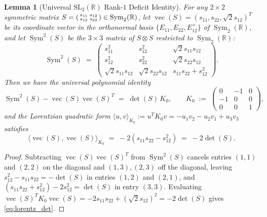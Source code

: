 \documentclass[11pt,a4paper]{article}
\theoremstyle{plain}
\newtheorem{lemma}[theorem]{Lemma}
\theoremstyle{definition}
\theoremstyle{remark}
\DeclareMathOperator{\Sym}{Sym}
\DeclareMathOperator{\vecop}{vec}
\begin{document}
\begin{lemma}[Universal $\mathrm{SL}_2(\mathbb{R})$ Rank-$1$ Deficit Identity]\label{lem:sl2}
For any $2 \times 2$ symmetric matrix $S = \begin{psmallmatrix} s_{11} & s_{12} \\ s_{12} & s_{22} \end{psmallmatrix} \in \Sym_2(\mathbb{R})$, let $\vecop(S) = (s_{11}, s_{22}, \sqrt{2}s_{12})^T$ be its coordinate vector in the orthonormal basis $\{E_{11}, E_{22}, E_{12}^+\}$ of $\Sym_2(\mathbb{R})$, and let $\Sym^2(S)$ be the $3 \times 3$ matrix of $S \otimes S$ restricted to $\Sym_2(\mathbb{R})$:
\[
  \Sym^2(S) \;=\; \begin{pmatrix} s_{11}^2 & s_{12}^2 & \sqrt{2}s_{11}s_{12} \\ s_{12}^2 & s_{22}^2 & \sqrt{2}s_{22}s_{12} \\ \sqrt{2}s_{11}s_{12} & \sqrt{2}s_{22}s_{12} & s_{11}s_{22} + s_{12}^2 \end{pmatrix}.
\]
Then we have the universal polynomial identity
\begin{equation}\label{eq:sl2_identity}
  \boxed{\Sym^2(S) - \vecop(S)\vecop(S)^T \;=\; \det(S)\, K_0, \qquad K_0 \;:=\; \begin{pmatrix} 0 & -1 & 0 \\ -1 & 0 & 0 \\ 0 & 0 & 1 \end{pmatrix},}
\end{equation}
and the Lorentzian quadratic form $\langle u, v \rangle_{K_0} := u^T K_0 v = -u_1 v_2 - u_2 v_1 + u_3 v_3$ satisfies
\begin{equation}\label{eq:lorentz_det}
  \langle \vecop(S), \vecop(S) \rangle_{K_0} \;=\; -2(s_{11}s_{22} - s_{12}^2) \;=\; -2\det(S).
\end{equation}
\end{lemma}

\begin{proof}
Subtracting $\vecop(S)\vecop(S)^T$ from $\Sym^2(S)$ cancels entries $(1,1)$ and $(2,2)$ on the diagonal and $(1,3), (2,3)$ off the diagonal, leaving $s_{12}^2 - s_{11}s_{22} = -\det(S)$ in entries $(1,2)$ and $(2,1)$, and $(s_{11}s_{22} + s_{12}^2) - 2s_{12}^2 = \det(S)$ in entry $(3,3)$. Evaluating $\vecop(S)^T K_0 \vecop(S) = -2 s_{11}s_{22} + (\sqrt{2}s_{12})^2 = -2\det(S)$ gives \eqref{eq:lorentz_det}.
\end{proof}
\end{document}
